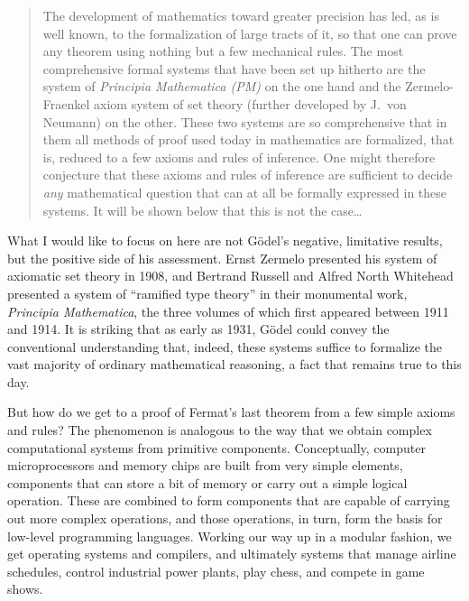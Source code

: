 \documentclass[11pt]{article}
\begin{document}
\begin{quote}
The development of mathematics toward greater precision has led, as is well known, to the formalization of large tracts of it, so that one can prove any theorem using nothing but a few mechanical rules. The most comprehensive formal systems that have been set up hitherto are the system of \emph{Principia Mathematica (PM)} on the one hand and the Zermelo-Fraenkel axiom system of set theory (further developed by J.~von Neumann) on the other. These two systems are so comprehensive that in them all methods of proof used today in mathematics are formalized, that is, reduced to a few axioms and rules of inference. One might therefore conjecture that these axioms and rules of inference are sufficient to decide \emph{any} mathematical question that can at all be formally expressed in these systems. It will be shown below that this is not the case\ldots
\end{quote}

What I would like to focus on here are not G\"odel's negative, limitative results, but the positive side of his assessment. Ernst Zermelo presented his system of axiomatic set theory in 1908, and Bertrand Russell and Alfred North Whitehead presented a system of ``ramified type theory'' in their monumental work, \emph{Principia Mathematica}, the three volumes of which first appeared between 1911 and 1914. It is striking that as early as 1931, G\"odel could convey the conventional understanding that, indeed, these systems suffice to formalize the vast majority of ordinary mathematical reasoning, a fact that remains true to this day.

But how do we get to a proof of Fermat's last theorem from a few simple axioms and rules? The phenomenon is analogous to the way that we obtain complex computational systems from primitive components. Conceptually, computer microprocessors and memory chips are built from very simple elements, components that can store a bit of memory or carry out a simple logical operation. These are combined to form components that are capable of carrying out more complex operations, and those operations, in turn, form the basis for low-level programming languages. Working our way up in a modular fashion, we get operating systems and compilers, and ultimately systems that manage airline schedules, control industrial power plants, play chess, and compete in game shows.
\end{document}
